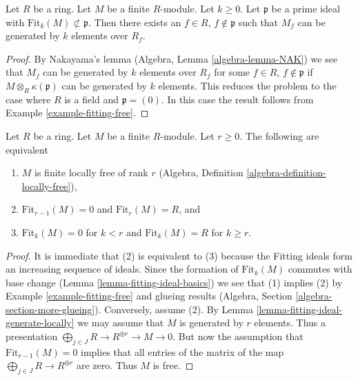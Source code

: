 \begin{lemma}
\label{lemma-fitting-ideal-generate-locally}
Let $R$ be a ring. Let $M$ be a finite $R$-module. Let $k \geq 0$.
Let $\mathfrak p$ be a prime ideal with
$\text{Fit}_k(M) \not \subset \mathfrak p$. Then there exists
an $f \in R$, $f \not \in \mathfrak p$ such that $M_f$ can be
generated by $k$ elements over $R_f$.
\end{lemma}

\begin{proof}
By Nakayama's lemma (Algebra, Lemma \ref{algebra-lemma-NAK}) we see that
$M_f$ can be generated by $k$ elements over $R_f$ for some
$f \in R$, $f \not \in \mathfrak p$ if $M \otimes_R \kappa(\mathfrak p)$
can be generated by $k$ elements. This reduces the problem to the
case where $R$ is a field and $\mathfrak p = (0)$. In this case
the result follows from Example \ref{example-fitting-free}.
\end{proof}

\begin{lemma}
\label{lemma-fitting-ideal-finite-locally-free}
Let $R$ be a ring. Let $M$ be a finite $R$-module. Let $r \geq 0$.
The following are equivalent
\begin{enumerate}
\item $M$ is finite locally free of rank $r$
(Algebra, Definition \ref{algebra-definition-locally-free}),
\item $\text{Fit}_{r - 1}(M) = 0$ and $\text{Fit}_r(M) = R$, and
\item $\text{Fit}_k(M) = 0$ for $k < r$ and $\text{Fit}_k(M) = R$
for $k \geq r$.
\end{enumerate}
\end{lemma}

\begin{proof}
It is immediate that (2) is equivalent to (3) because the Fitting ideals
form an increasing sequence of ideals.
Since the formation of $\text{Fit}_k(M)$ commutes with base change
(Lemma \ref{lemma-fitting-ideal-basics}) we see that (1) implies (2) by
Example \ref{example-fitting-free}
and glueing results (Algebra, Section \ref{algebra-section-more-glueing}).
Conversely, assume (2). By
Lemma \ref{lemma-fitting-ideal-generate-locally} we may assume that $M$
is generated by $r$ elements. Thus a presentation
$\bigoplus_{j \in J} R \to R^{\oplus r} \to M \to 0$.
But now the assumption that $\text{Fit}_{r - 1}(M) = 0$ implies
that all entries of the matrix of the map
$\bigoplus_{j \in J} R \to R^{\oplus r}$ are zero.
Thus $M$ is free.
\end{proof}

